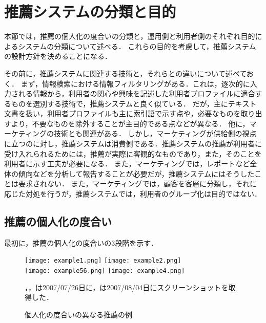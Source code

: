 \chapter{推薦システムの分類と目的}
\label{chap:category}

本節では，推薦の個人化の度合いの分類と，運用側と利用者側のそれぞれ目的によるシステムの分類について述べる．
これらの目的を考慮して，推薦システムの設計方針を決めることになる．

その前に，推薦システムに関連する技術と，それらとの違いについて述べておく．
まず，情報検索における情報フィルタリングがある．これは，逐次的に入力される情報から，利用者の関心や興味を記述した利用者プロファイルに適合するものを選別する技術\cite{jb:012:00}で，推薦システムと良く似ている．
だが，主にテキスト文書を扱い，利用者プロファイルも主に索引語で示す点や，必要なものを取り出すより，不要なものを除外することが主目的である点などが異なる．
他に，マーケティングの技術とも関連がある．
しかし，マーケティングが供給側の視点に立つのに対し，推薦システムは消費側である．推薦システムの推薦が利用者に受け入れられるためには，推薦が実際に客観的なものであり，また，そのことを利用者に示す工夫が必要になる．
また，マーケティングでは，レポートなど全体の傾向などを分析して報告することが必要だが，推薦システムにはそうしたことは要求されない．
また，マーケティングでは，顧客を客層に分類し，それに応じた対処を行うが，推薦システムでは，利用者のグループ化は目的ではない．

\section{推薦の個人化の度合い}
\label{sec:plevel}

最初に，推薦の個人化の度合いの3段階\cite{dmkd:01:01}を示す．

\begin{figure}
\centering
{}%
{\texttt{[image: example1.png]}}%
\hspace{0.08\linewidth}%
%
{\texttt{[image: example2.png]}}\\\medskip
{}%
{\texttt{[image: example56.png]}}
\hspace{0.08\linewidth}%
%
{\texttt{[image: example4.png]}}\\
\caption{個人化の度合いの異なる推薦の例}
\label{fig:plevel}
{\footnotesize{}，，は2007/07/26日に，は2007/08/04日にスクリーンショットを取得した．}
\end{figure}


